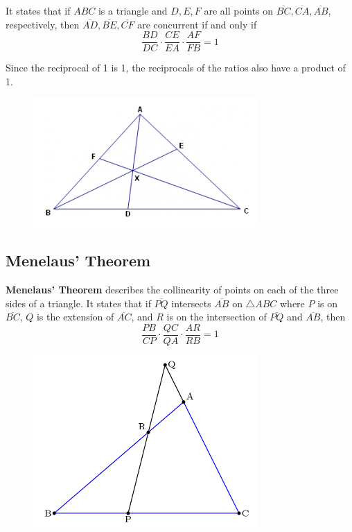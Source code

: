         \noindent It states that if $ABC$ is a triangle and $D,E,F$ are all points on
        $\overline{BC},\overline{CA},\overline{AB}$, respectively, then $\overline{AD},
        \overline{BE},\overline{CF}$ are concurrent if and only if \\

        \begin{equation*}
            \frac{BD}{DC}\cdot\frac{CE}{EA}\cdot\frac{AF}{FB}=1
        \end{equation*}

        \noindent Since the reciprocal of 1 is 1, the reciprocals of the ratios also have a
        product of 1. \\

        \begin{figure} [hbt!]
            \centering
            \includegraphics[scale=0.75]{Resources/Unit2Triangles/ceva.PNG}
        \end{figure}



    \pagebreak
    \subsection{Menelaus' Theorem}
        \color{purple} \textbf{Menelaus' Theorem} \color{black} describes the collinearity of
        points on each of the three sides of a triangle. It states that if $\overline{PQ}$
        intersects $\overline{AB}$ on $\triangle ABC$ where $P$ is on $\overline{BC}$, $Q$ is
        the extension of $\overline{AC}$, and $R$ is on the intersection of $\overline{PQ}$ and
        $\overline{AB}$, then \\

        \begin{equation*}
            \frac{PB}{CP}\cdot\frac{QC}{QA}\cdot\frac{AR}{RB}=1
        \end{equation*}

        \begin{figure} [hbt!]
            \centering
            \includegraphics[scale=0.75]{Resources/Unit2Triangles/menelaus.PNG}
        \end{figure}